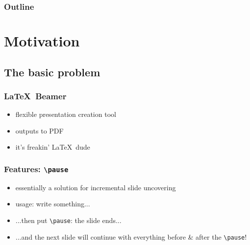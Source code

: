 \maketitle

\begin{frame}\frametitle{Outline}
\tableofcontents[pausesections]
\end{frame}

\section{Motivation}
\subsection{The basic problem}
\newcommand{\cmdverb}[1]{\texttt{\textbackslash #1}}
\begin{frame}\frametitle{\LaTeX\ Beamer}
\begin{itemize}
    \item flexible presentation creation tool
    \item outputs to PDF
    \item it's freakin' \LaTeX\ dude
\end{itemize}
\end{frame}

\begin{frame}\frametitle{Features: \cmdverb{pause}}
\begin{itemize}
    \item essentially a solution for incremental slide uncovering
    \item usage: write something...
    \item ...then put \cmdverb{pause}: the slide ends...
    \pause
    \item ...and the next slide will continue with everything before \& after
        the \cmdverb{pause}!
\end{itemize}
\end{frame}
